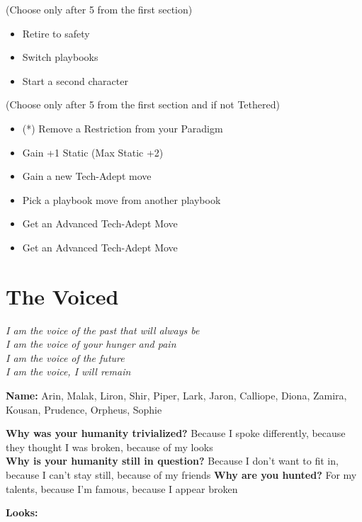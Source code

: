 \documentclass[
  oneside,
  statementpaper,
  9pt]{memoir}
\begin{document}
(Choose only after 5 from the first section)

\begin{itemize}
\tightlist
\item
  Retire to safety
\item
  Switch playbooks
\item
  Start a second character
\end{itemize}

(Choose only after 5 from the first section and if not Tethered)

\begin{itemize}
\tightlist
\item
  (*) Remove a Restriction from your Paradigm
\item
  Gain +1 Static (Max Static +2)
\item
  Gain a new Tech-Adept move
\item
  Pick a playbook move from another playbook
\item
  Get an Advanced Tech-Adept Move
\item
  Get an Advanced Tech-Adept Move
\end{itemize}

\newpage

\hypertarget{the-voiced}{%
\section{The Voiced}\label{the-voiced}}

\emph{I am the voice of the past that will always be}\\
\emph{I am the voice of your hunger and pain}\\
\emph{I am the voice of the future}\\
\emph{I am the voice, I will remain}

\textbf{Name:} Arin, Malak, Liron, Shir, Piper, Lark, Jaron, Calliope,
Diona, Zamira, Kousan, Prudence, Orpheus, Sophie

\textbf{Why was your humanity trivialized?} Because I spoke differently,
because they thought I was broken, because of my looks\\
\textbf{Why is your humanity still in question?} Because I don't want to
fit in, because I can't stay still, because of my friends \textbf{Why
are you hunted?} For my talents, because I'm famous, because I appear
broken

\textbf{Looks:}
\end{document}
